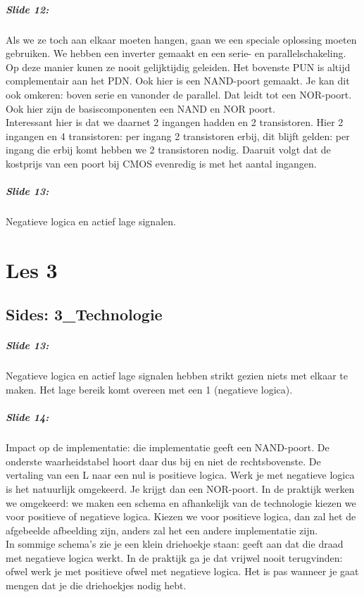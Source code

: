 \documentclass[10pt,a4paper]{book}
\begin{document}
\paragraph{Slide 12:} Als we ze toch aan elkaar moeten hangen, gaan we een speciale oplossing moeten gebruiken.  We hebben een inverter gemaakt en een serie- en parallelschakeling. Op deze manier kunen ze nooit gelijktijdig geleiden. Het bovenste PUN is altijd complementair aan het PDN. Ook hier is een NAND-poort gemaakt. Je kan dit ook omkeren: boven serie en vanonder de parallel. Dat leidt tot een NOR-poort. Ook hier zijn de basiscomponenten een NAND en NOR  poort.\\
Interessant hier is dat we daarnet 2 ingangen hadden en 2 transistoren. Hier 2 ingangen en 4 transistoren: per ingang 2 transistoren erbij, dit blijft gelden: per ingang die erbij komt hebben we 2 transistoren nodig. Daaruit volgt dat de kostprijs van een poort bij CMOS evenredig is met het aantal ingangen.

\paragraph{Slide 13:} Negatieve logica en actief lage signalen.

\chapter{Les 3}

\section{Sides: 3\_Technologie}

\paragraph{Slide 13:} Negatieve logica en actief lage signalen hebben strikt gezien niets met elkaar te maken. Het lage bereik komt overeen met een 1 (negatieve logica).

\paragraph{Slide 14:} Impact op de implementatie: die implementatie geeft een NAND-poort. De onderste waarheidstabel hoort daar dus bij en niet de rechtsbovenste. De vertaling van een L naar een nul is positieve logica. Werk je met negatieve logica is het natuurlijk omgekeerd. Je krijgt dan een NOR-poort. In de praktijk werken we omgekeerd: we maken een schema en afhankelijk van de technologie kiezen we voor positieve of negatieve logica. Kiezen we voor positieve logica, dan zal het de afgebeelde afbeelding zijn, anders zal het een andere implementatie zijn.\\
In sommige schema's zie je een klein driehoekje staan: geeft aan dat die draad met negatieve logica werkt. In de praktijk ga je dat vrijwel nooit terugvinden: ofwel werk je met positieve ofwel met negatieve logica. Het is pas wanneer je gaat mengen dat je die driehoekjes nodig hebt.
\end{document}
